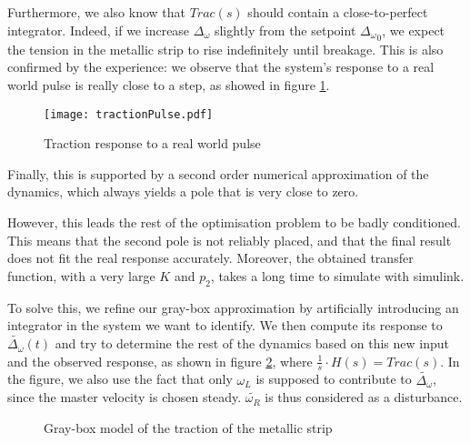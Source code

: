 Furthermore, we also know that $Trac(s)$ should contain a close-to-perfect integrator. Indeed, if we increase $\Delta_\omega$ slightly from the setpoint ${\Delta_\omega}_0$, we expect the tension in the metallic strip to rise indefinitely until breakage. This is also confirmed by the experience: we observe that the system's response to a real world pulse is really close to a step, as showed in figure \ref{fig:tracImpulseResponse}.
\begin{figure}[htbp]
\centering
\texttt{[image: tractionPulse.pdf]}
\caption{Traction response to a real world pulse\label{fig:tracImpulseResponse}}
\end{figure}
Finally, this is supported by a second order numerical approximation of the dynamics, which always yields a pole that is very close to zero.

However, this leads the rest of the optimisation problem to be badly conditioned. This means that the second pole is not reliably placed, and that the final result does not fit the real response accurately. Moreover, the obtained transfer function, with a very large $K$ and $p_2$, takes a long time to simulate with simulink.

To solve this, we refine our gray-box approximation by artificially introducing an integrator in the system we want to identify. We then compute its response to $\tilde{\Delta_\omega}(t)$ and try to determine the rest of the dynamics based on this new input and the observed response, as shown in figure \ref{fig:tractionGrayBox}, where $\frac{1}{s}\cdot H(s) = Trac(s)$. In the figure, we also use the fact that only $\omega_L$ is supposed to contribute to $\tilde{\Delta_\omega}$, since the master velocity is chosen steady. $\tilde{\omega_R}$ is thus considered as a disturbance.
\begin{figure}[htbp]
\centering
{}
\caption{\label{fig:tractionInput}Gray-box model of the traction of the metallic strip\label{fig:tractionGrayBox}}
\end{figure}

